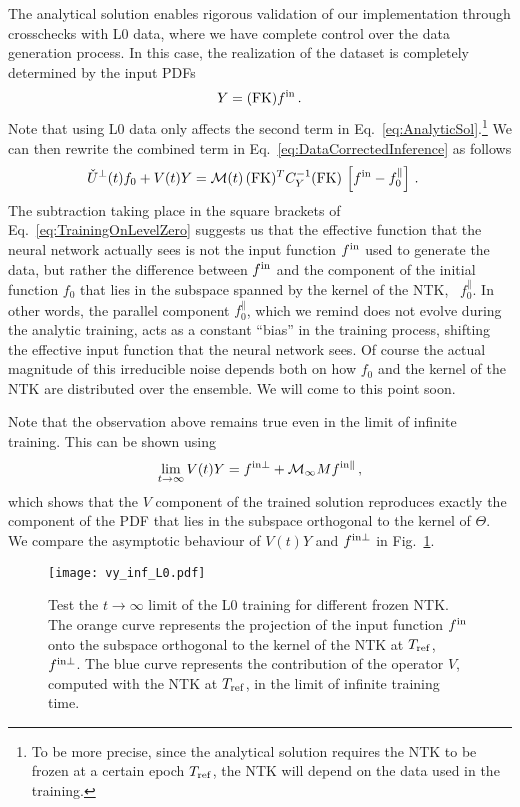 The analytical solution enables rigorous validation of our implementation 
through crosschecks with L0 data, where we have complete control over 
the data generation process. In this case, the realization of the dataset is 
completely determined by the input PDFs
\begin{equation}
    \label{eq:DataL0NoIndices}
    Y = (\mathrm{FK}) f^{\rm in}\, .
\end{equation}
Note that using L0 data only affects the second term in
Eq.~\ref{eq:AnalyticSol}.\footnote{To be more precise, since the analytical
solution requires the NTK to be frozen at a certain epoch $T_{\rm ref}$, the
NTK will depend on the data used in the training.} We can then rewrite
the combined term in Eq.~\eqref{eq:DataCorrectedInference} as follows
\begin{align}
  \label{eq:TrainingOnLevelZero}
  \check{U}^\perp(t) f_0 + V(t) Y 
    &= \mathcal{M}(t)\, (\mathrm{FK})^T C_{Y}^{-1} (\mathrm{FK})\, 
      \left[f^{\rm in} - f_{0}^\parallel\right]\, .
\end{align}
The subtraction taking place in the square brackets of
Eq.~\eqref{eq:TrainingOnLevelZero} suggests us that the effective function that
the neural network actually sees is not the input function $f^{\rm in}$ used to
generate the data, but rather the difference between $f^{\rm in}$ and the component of
the initial function $f_0$ that lies in the subspace spanned by the kernel of
the NTK, \ie\ $f_0^\parallel$. In other words, the parallel component
$f_0^\parallel$, which we remind does not evolve during the analytic training,
acts as a constant ``bias'' in the training process, shifting the effective
input function that the neural network sees. Of course the actual magnitude of
this irreducible noise depends both on how $f_0$ and the kernel of the NTK are
distributed over the ensemble. We will come to this point soon.

Note that the observation above remains true even in the limit of infinite
training. This can be shown using 
\begin{align}
    \label{eq:LevelZeroClosureInfiniteTraining}
    \lim_{t\to\infty} V(t) Y = f^{\rm in \perp} + \mathcal{M}_{\infty} M f^{\rm in \parallel}\, ,
\end{align}
which shows that the $V$ component of the trained solution reproduces exactly the
component of the PDF that lies in  the subspace orthogonal to the kernel of
$\Theta$. We compare the asymptotic behaviour of $V(t) Y$ and $f^{\rm in \perp}$ in
Fig.~\ref{fig:InfiniteTimeVterm}.

\begin{figure}[t]
  \centering
  \texttt{[image: vy\_inf\_L0.pdf]}  
  \caption{Test the $t\to\infty$ limit of the L0 training for different frozen
  NTK. The orange curve represents the projection of the input function $f^{\rm in}$
  onto the subspace orthogonal to the kernel of the NTK at $T_{\rm ref}$, \ie\
  $f^{\rm in \perp}$. The blue curve represents the contribution of the operator $V$,
  computed with the NTK at $T_{\rm ref}$, in the limit of infinite training
  time.}
  \label{fig:InfiniteTimeVterm}
\end{figure}

